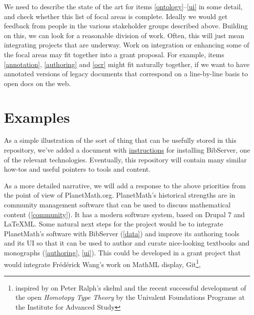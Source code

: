 \documentclass{article}
\begin{document}
We need to describe the state of the art for items \ref{ontology}--\ref{ui} in some detail, and check whether this list of focal areas is complete.  Ideally we would get feedback from people in the various stakeholder groups described above.  Building on this, we can look for a reasonable division of work.  Often, this will just mean integrating projects that are underway.  Work on integration or enhancing some of the focal areas may fit together into a grant proposal.  For example, items \ref{annotation}, \ref{authoring} and \ref{ocr} might fit naturally together, if we want to have annotated versions of legacy documents that correspond on a line-by-line basis to open docs on the web.

\section{Examples}

As a simple illustration of the sort of thing that can be usefully stored in this repository, we've added a document with \href{http://holtzermann17.github.io/skelodml/bibserver-setup.html}{instructions} for installing BibServer, one of the relevant technologies.  Eventually, this repository will contain many similar how-tos and useful pointers to tools and content.

As a more detailed narrative, we will add a response to the above priorities from the point of view of PlanetMath.org.  PlanetMath's historical strengths are in community management software that can be used to discuss mathematical content (\ref{community}).  It has a modern software system, based on Drupal 7 and LaTeXML.  Some natural next steps for the project would be to integrate PlanetMath's software with BibServer (\ref{data}) and improve its authoring tools and its UI so that it can be used to author and curate nice-looking textbooks and monographs (\ref{authoring}, \ref{ui}).  This could be developed in a grant project that would integrate Fr\'ed\'erick Wang's work on MathML display, Git\footnote{inspired by on Peter Ralph's skelml and the recent successful development of the open \emph{Homotopy Type Theory} by the Univalent Foundations Programe at the Institute for Advanced Study}, 
\end{document}

